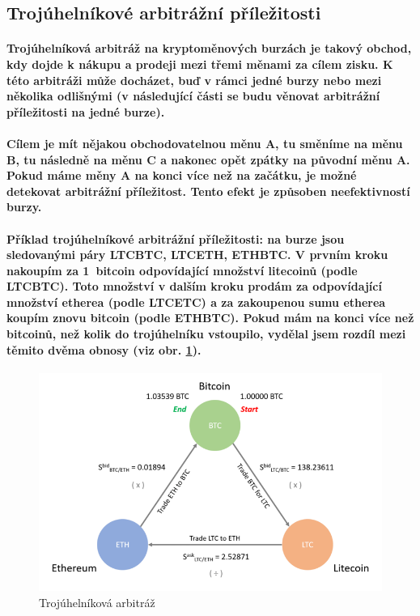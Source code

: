 \documentclass[thesis=B,czech]{FITthesis}[2019/03/21]
\begin{document}
\subsection{Trojúhelníkové arbitrážní příležitosti}
\paragraph{
Trojúhelníková arbitráž na kryptoměnových burzách je takový obchod, kdy dojde k nákupu a prodeji mezi třemi měnami za cílem zisku. K této arbitráži může docházet, buď v rámci jedné burzy nebo mezi několika odlišnými (v následující části se budu věnovat arbitrážní příležitosti na jedné burze). \cite{TradingStrategy}
}
\paragraph{
Cílem je mít nějakou obchodovatelnou měnu A, tu směníme na měnu B, tu následně na měnu C a nakonec opět zpátky na původní měnu A. Pokud máme měny A na konci více než na začátku, je možné detekovat arbitrážní příležitost. Tento efekt je způsoben neefektivností burzy.
}
\paragraph{
Příklad trojúhelníkové arbitrážní příležitosti: na burze jsou sledovanými páry LTCBTC, LTCETH, ETHBTC. V prvním kroku nakoupím za 1~bitcoin odpovídající množství litecoinů (podle LTCBTC). Toto množství v dalším kroku prodám za odpovídající množství etherea (podle LTCETC) a za zakoupenou sumu etherea koupím znovu bitcoin (podle ETHBTC). Pokud mám na konci více než bitcoinů, než kolik do trojúhelníku vstoupilo, vydělal jsem rozdíl mezi těmito dvěma obnosy (viz obr. \ref{triangle_arbitrage}).
}
\begin{figure}\centering
	\includegraphics[width=1\textwidth]{images/ZMENIT-triangle.png}
	\caption{Trojúhelníková arbitráž}\label{triangle_arbitrage}
\end{figure}
\end{document}
